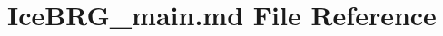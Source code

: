 \hypertarget{IceBRG__main_8md}{}\section{Ice\+B\+R\+G\+\_\+main.\+md File Reference}
\label{IceBRG__main_8md}
